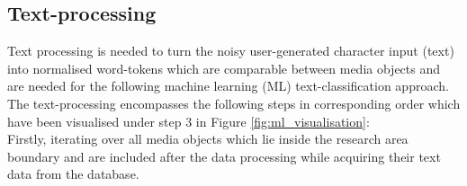 \subsection{Text-processing} \label{text_processing}
Text processing is needed to turn the noisy user-generated character input (text) into normalised word-tokens which are comparable between media objects and are needed for the following machine learning (ML) text-classification approach. The text-processing encompasses the following steps in corresponding order which have been visualised under step 3 in Figure \ref{fig:ml_visualisation}:\\
Firstly, iterating over all media objects which lie inside the research area boundary and are included after the data processing while acquiring their text data from the database.

